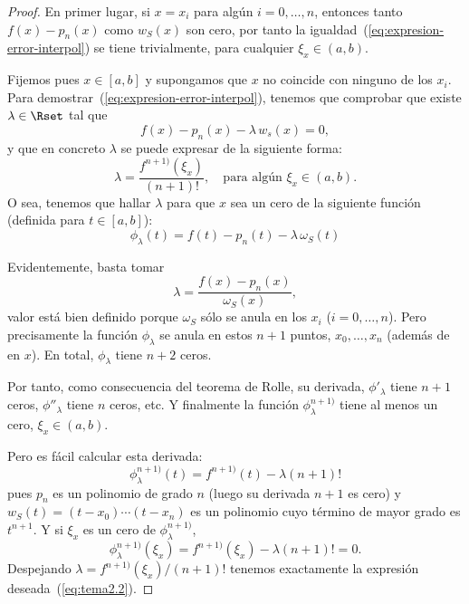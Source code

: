 \begin{proof}

  En primer lugar, si $x=x_i$ para algún $i=0,\dots,n$, entonces tanto
  $f(x)-p_n(x)$ como $w_S(x)$ son cero, por tanto la
  igualdad~(\ref{eq:expresion-error-interpol}) se tiene trivialmente,
  para cualquier $\xi_x\in(a,b)$.

  Fijemos pues $x\in [a,b]$ y supongamos que $x$ no coincide con
  ninguno de los $x_i$. Para
  demostrar~(\ref{eq:expresion-error-interpol}), tenemos que comprobar
  que existe $\lambda\in\Rset$ tal que
  \begin{equation*}
    f(x)-p_n(x)-\lambda\, w_s(x)=0,
  \end{equation*}
  y que en concreto $\lambda$ se puede expresar de la siguiente forma:
  \begin{equation}
    \lambda=\frac{f^{n+1)}(\xi_x)}{(n+1)!},
    \quad\text{para algún } \xi_x\in (a,b).
    \label{eq:tema2.2}
  \end{equation}
  O sea, tenemos que hallar $\lambda$ %
  para que $x$ sea un cero de la
  siguiente función (definida para $t\in[a,b]$):
  \begin{equation*}
    \phi_{\lambda}(t)=f(t)-p_n(t)-\lambda\, \omega_S(t)
  \end{equation*}

  Evidentemente, %
  basta tomar
  $$
  \lambda = \frac{f(x)-p_n(x)}{\omega_S(x)},
  $$
  valor está bien definido porque $\omega_S$ sólo se anula en los
  $x_i$ ($i=0,\dots,n$).  Pero precisamente la función $\phi_\lambda$
  se anula en estos $n+1$ puntos, $x_0,\dots,x_n$ (además de en
  $x$). En total, $\phi_\lambda$ tiene $n+2$ ceros.

  Por tanto, como consecuencia del teorema de Rolle, su derivada,
  $\phi'_\lambda$ tiene $n+1$ ceros, $\phi''_\lambda$ tiene $n$ ceros,
  etc. Y finalmente la función $\phi_\lambda^{n+1)}$ tiene al menos un cero, $\xi_x\in(a,b)$.

  Pero es fácil calcular esta derivada:
  $$\phi_\lambda^{n+1)}(t) = f^{n+1)}(t) - \lambda (n+1)!$$
  pues $p_n$ es un polinomio de grado $n$ (luego su derivada $n+1$ es cero) y
  $w_S(t)=(t-x_0)\cdots(t-x_n)$ es un polinomio cuyo término de mayor grado
  es $t^{n+1}$. Y si $\xi_x$ es un cero de $ \phi_\lambda^{n+1)}$,
  $$
   \phi_\lambda^{n+1)}(\xi_x) = f^{n+1)}(\xi_x)- \lambda (n+1)! = 0.
  $$
  Despejando $\lambda=f^{n+1)}(\xi_x)/(n+1)!$ tenemos exactamente la expresión
  deseada~(\ref{eq:tema2.2}).


\end{proof}
